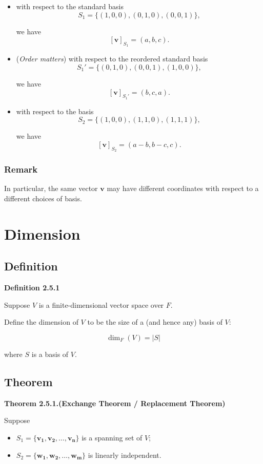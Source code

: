 \documentclass[12pt]{article}
\begin{document}
\begin{itemize}

\item with respect to the standard basis
\[
S_1=\{(1,0,0),(0,1,0),(0,0,1)\},
\]

we have
\[
[\mathbf{v}]_{S_1}=(a,b,c).
\]

\item (\emph{Order matters}) with respect to the reordered standard basis
\[
S_1'=\{(0,1,0),(0,0,1),(1,0,0)\},
\]

we have
\[
[\mathbf{v}]_{S_1'}=(b,c,a).
\]

\item with respect to the basis
\[
S_2=\{(1,0,0),(1,1,0),(1,1,1)\},
\]

we have
\[
[\mathbf{v}]_{S_2}=(a-b,b-c,c).
\]

\end{itemize}

\subsubsection{Remark}
In particular, the same vector $\mathbf{v}$ may have different coordinates with respect to a different choices of basis.

\newpage

\section{Dimension}

\subsection{Definition}

\textbf{Definition 2.5.1}

Suppose $V$ is a finite-dimensional vector space over $F$.

Define the dimension of $V$ to be the size of a (and hence any) basis of $V$:

\[
\dim_F(V)=|S|
\]

where $S$ is a basis of $V$.


\subsection{Theorem}

\textbf{Theorem 2.5.1.(Exchange Theorem / Replacement Theorem)}

Suppose

\begin{itemize}
    \item $S_1=\{\mathbf{v_1,v_2,\ldots,v_n}\}$ is a spanning set of $V$;

    \item $S_2=\{\mathbf{w_1,w_2,\ldots,w_m}\}$ is linearly independent.
\end{itemize}
\end{document}
